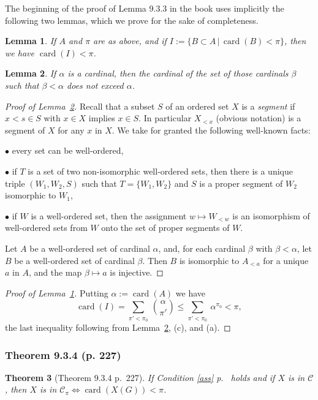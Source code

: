 \documentclass[12pt]{article}%
\newtheorem{thm}{Theorem}%
\newtheorem{lem}[thm]{Lemma}
\theoremstyle{remark}
\theoremstyle{definition}
\newcommand{\bu}{\bullet}
\newcommand{\nn}{\noindent}
\newcommand{\C}{\mathcal C}
\newcommand{\ssi}{\Leftrightarrow}%
\DeclareMathOperator{\card}{card}%
\begin{document}
The beginning of the proof of Lemma 9.3.3 in the book uses implicitly the following two lemmas, which we prove for the sake of completeness.

\begin{lem}\label{cardipi}
If $A$ and $\pi$ are as above, and if $I:=\{B\subset A\,|\,\card(B)<\pi\}$, then we have $\card(I)<\pi$. 
\end{lem}

\begin{lem}\label{ord}
If $\alpha$ is a cardinal, then the cardinal of the set of those cardinals $\beta$ such that $\beta<\alpha$ does not exceed $\alpha$.
\end{lem}

\begin{proof}[Proof of Lemma~\ref{ord}]
Recall that a subset $S$ of an ordered set $X$ is a {\em segment} if $x<s\in S$ with $x\in X$ implies $x\in S$. In particular $X_{<x}$ (obvious notation) is a segment of $X$ for any $x$ in $X$. We take for granted the following well-known facts:

\nn$\bu$ every set can be well-ordered,

\nn$\bu$ if $T$ is a set of two non-isomorphic well-ordered sets, then there is a unique triple $(W_1,W_2,S)$ such that $T=\{W_1,W_2\}$ and $S$ is a proper segment of $W_2$ isomorphic to $W_1$,

\nn$\bu$ if $W$ is a well-ordered set, then the assignment $w\mapsto W_{<w}$ is an isomorphism of well-ordered sets from $W$ onto the set of proper segments of $W$.

Let $A$ be a well-ordered set of cardinal $\alpha$, and, for each cardinal $\beta$ with $\beta<\alpha$, let $B$ be a well-ordered set of cardinal $\beta$. Then $B$ is isomorphic to $A_{<a}$ for a unique $a$ in $A$, and the map $\beta\mapsto a$ is injective.
\end{proof}

\begin{proof}[Proof of Lemma~\ref{cardipi}] 
Putting $\alpha:=\card(A)$ we have
$$
\card(I)=\sum_{\pi'<\pi_0}\ \binom{\alpha}{\pi'}\le\sum_{\pi'<\pi_0}\ \alpha^{\pi_0}<\pi,
$$ 
the last inequality following from Lemma~\ref{ord}, (c), and (a). 
\end{proof}

\subsubsection{Theorem 9.3.4 (p. 227)}

\begin{thm}[Theorem 9.3.4 p.~227]\label{934}
If Condition \ref{ass} p.~\pageref{ass} holds and if $X$ is in $\C$, then $X$ is in $\C_\pi\ssi\card(X(G))<\pi$.
\end{thm}
\end{document}

